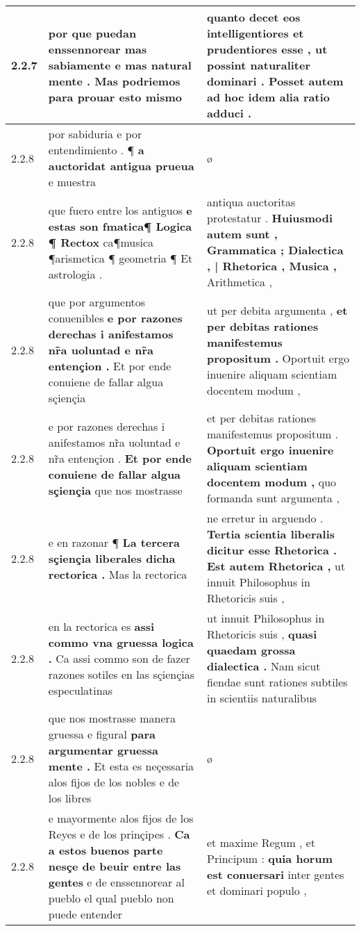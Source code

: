 \begin{tabular}{|p{1cm}|p{6.5cm}|p{6.5cm}|}
2.2.7 & por que puedan enssennorear mas sabiamente \textbf{ e mas natural mente . } Mas podriemos para prouar esto mismo & quanto decet eos intelligentiores \textbf{ et prudentiores esse , } ut possint naturaliter dominari . Posset autem ad hoc idem alia ratio adduci . \\\hline
2.2.8 & por sabiduria e por entendimiento . ¶ \textbf{ a auctoridat antigua prueua } e muestra & ø \\\hline
2.2.8 & que fuero entre los antiguos \textbf{ e estas son fmatica¶ Logica ¶ Rectox } ca¶musica ¶arismetica ¶ geometria ¶ Et astrologia . & antiqua auctoritas protestatur . \textbf{ Huiusmodi autem sunt , Grammatica ; Dialectica , | Rhetorica , Musica , } Arithmetica , \\\hline
2.2.8 & que por argumentos conuenibles \textbf{ e por razones derechas i anifestamos nr̃a uoluntad e nr̃a entençion . } Et por ende conuiene de fallar algua sçiençia & ut per debita argumenta , \textbf{ et per debitas rationes manifestemus propositum . } Oportuit ergo inuenire aliquam scientiam docentem modum , \\\hline
2.2.8 & e por razones derechas i anifestamos nr̃a uoluntad e nr̃a entençion . \textbf{ Et por ende conuiene de fallar algua sçiençia } que nos mostrasse & et per debitas rationes manifestemus propositum . \textbf{ Oportuit ergo inuenire aliquam scientiam docentem modum , } quo formanda sunt argumenta , \\\hline
2.2.8 & e en razonar ¶ \textbf{ La tercera sçiençia liberales dicha rectorica . } Mas la rectorica & ne erretur in arguendo . \textbf{ Tertia scientia liberalis dicitur esse Rhetorica . Est autem Rhetorica , } ut innuit Philosophus in Rhetoricis suis , \\\hline
2.2.8 & en la rectorica es \textbf{ assi commo vna gruessa logica . } Ca assi commo son de fazer razones sotiles en las sçiençias especulatinas & ut innuit Philosophus in Rhetoricis suis , \textbf{ quasi quaedam grossa dialectica . } Nam sicut fiendae sunt rationes subtiles in scientiis naturalibus \\\hline
2.2.8 & que nos mostrasse manera gruessa e figural \textbf{ para argumentar gruessa mente . } Et esta es neçessaria alos fijos de los nobles e de los libres & ø \\\hline
2.2.8 & e mayormente alos fijos de los Reyes e de los prinçipes . \textbf{ Ca a estos buenos parte nesçe de beuir entre las gentes } e de enssennorear al pueblo el qual pueblo non puede entender & et maxime Regum , et Principum : \textbf{ quia horum est conuersari } inter gentes et dominari populo , \\\hline

\end{tabular}
